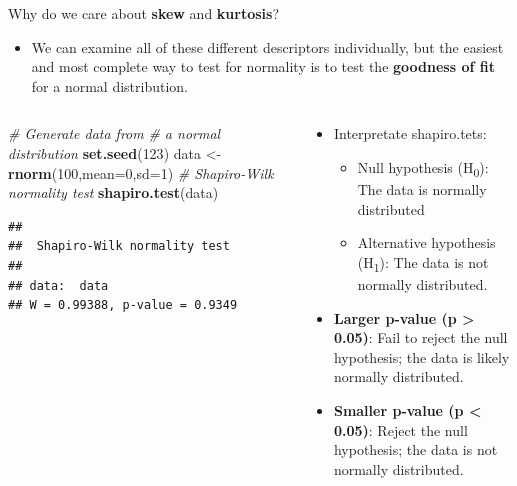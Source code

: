 \documentclass[
  ignorenonframetext,
]{beamer}
\newenvironment{Shaded}{\begin{snugshade}}{\end{snugshade}}
\newcommand{\AttributeTok}[1]{\textcolor[rgb]{0.13,0.29,0.53}{#1}}
\newcommand{\CommentTok}[1]{\textcolor[rgb]{0.56,0.35,0.01}{\textit{#1}}}
\newcommand{\DecValTok}[1]{\textcolor[rgb]{0.00,0.00,0.81}{#1}}
\newcommand{\FunctionTok}[1]{\textcolor[rgb]{0.13,0.29,0.53}{\textbf{#1}}}
\newcommand{\NormalTok}[1]{#1}
\newcommand{\OtherTok}[1]{\textcolor[rgb]{0.56,0.35,0.01}{#1}}
\providecommand{\tightlist}{%
  \setlength{\itemsep}{0pt}\setlength{\parskip}{0pt}}
\begin{document}
\begin{frame}[fragile]{Why do we care about \textbf{skew} and
\textbf{kurtosis}?}
\label{why-do-we-care-about-skew-and-kurtosis-3}
\begin{itemize}
\tightlist
\item
  We can examine all of these different descriptors individually, but
  the easiest and most complete way to test for normality is to test the
  \textbf{goodness of fit} for a normal distribution.
\end{itemize}

\begin{columns}[T]
\begin{column}{0.48\textwidth}
\tiny

\begin{Shaded}
\begin{Highlighting}[]
\CommentTok{\# Generate data from }
\CommentTok{\# a normal distribution}
\FunctionTok{set.seed}\NormalTok{(}\DecValTok{123}\NormalTok{)}
\NormalTok{data }\OtherTok{\textless{}{-}} \FunctionTok{rnorm}\NormalTok{(}\DecValTok{100}\NormalTok{,}\AttributeTok{mean=}\DecValTok{0}\NormalTok{,}\AttributeTok{sd=}\DecValTok{1}\NormalTok{)}
\CommentTok{\# Shapiro{-}Wilk normality test}
\FunctionTok{shapiro.test}\NormalTok{(data)}
\end{Highlighting}
\end{Shaded}

\begin{verbatim}
## 
##  Shapiro-Wilk normality test
## 
## data:  data
## W = 0.99388, p-value = 0.9349
\end{verbatim}

\normalsize
\end{column}

\begin{column}{0.48\textwidth}
\small

\begin{itemize}
\item
  Interpretate shapiro.tets:

  \begin{itemize}
  \item
    Null hypothesis (H\textsubscript{0}): The data is normally
    distributed
  \item
    Alternative hypothesis (H\textsubscript{1}): The data is not
    normally distributed.
  \end{itemize}
\end{itemize}

\begin{itemize}
\item
  \textbf{Larger p-value (p \textgreater{} 0.05)}: Fail to reject the
  null hypothesis; the data is likely normally distributed.
\item
  \textbf{Smaller p-value (p \textless{} 0.05)}: Reject the null
  hypothesis; the data is not normally distributed. \normalsize
\end{itemize}
\end{column}
\end{columns}
\end{frame}
\end{document}
